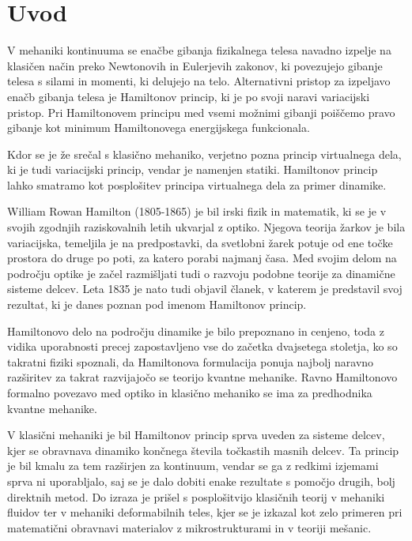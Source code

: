 \chapter{Uvod} 


V mehaniki kontinuuma se enačbe gibanja fizikalnega telesa navadno izpelje
na klasičen način preko Newtonovih in Eulerjevih zakonov, ki povezujejo
gibanje telesa s silami in momenti, ki delujejo na telo. Alternativni pristop
za izpeljavo enačb gibanja telesa je Hamiltonov princip, ki je po svoji
naravi variacijski pristop. Pri Hamiltonovem principu med vsemi možnimi
gibanji poiščemo pravo gibanje kot minimum Hamiltonovega energijskega funkcionala.

Kdor se je že srečal s klasično mehaniko, verjetno pozna princip virtualnega dela,
ki je tudi variacijski princip, vendar je namenjen statiki. Hamiltonov
princip lahko smatramo kot posplošitev principa virtualnega dela za primer dinamike.

William Rowan Hamilton (1805-1865) je bil irski fizik in matematik, ki se je
v svojih zgodnjih raziskovalnih letih ukvarjal z optiko. Njegova teorija žarkov
je bila variacijska, temeljila je na predpostavki, da svetlobni žarek potuje
od ene točke prostora do druge po poti, za katero porabi najmanj časa. Med
svojim delom na področju optike je začel razmišljati tudi o razvoju podobne
teorije za dinamične sisteme delcev. Leta 1835 je nato tudi objavil članek, v katerem
je predstavil svoj rezultat, ki je danes poznan pod imenom Hamiltonov princip.

Hamiltonovo delo na področju dinamike je bilo prepoznano in cenjeno, toda
z vidika uporabnosti precej zapostavljeno vse do začetka dvajsetega stoletja,
ko so takratni fiziki spoznali, da Hamiltonova formulacija ponuja najbolj
naravno razširitev za takrat razvijajočo se teorijo kvantne mehanike.
Ravno Hamiltonovo formalno povezavo med optiko in klasično mehaniko se ima
za predhodnika kvantne mehanike.

V klasični mehaniki je bil Hamiltonov princip sprva uveden za sisteme delcev,
kjer se obravnava dinamiko končnega števila točkastih masnih delcev.
Ta princip je bil kmalu za tem razširjen za kontinuum, vendar se ga
z redkimi izjemami sprva ni uporabljalo, saj se je dalo dobiti enake rezultate
s pomočjo drugih, bolj direktnih metod. Do izraza je prišel s posplošitvijo
klasičnih teorij v mehaniki fluidov ter v mehaniki deformabilnih teles,
kjer se je izkazal kot zelo primeren pri matematični obravnavi materialov z mikrostrukturami
in v teoriji mešanic.

